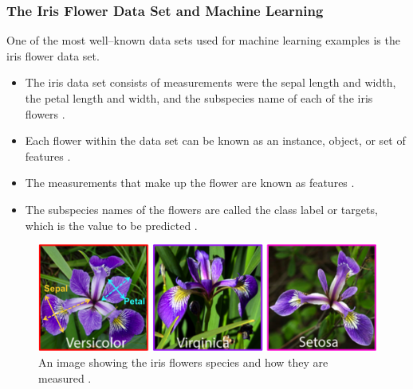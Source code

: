 \documentclass{beamer}
\begin{document}
\begin{frame}
\frametitle{The Iris Flower Data Set and Machine Learning}
\footnotesize
One of the most well--known data sets used for machine learning examples is the iris flower data set.
\newline
\begin{itemize}
    \item The iris data set consists of measurements were the sepal length and width, the petal length and width, and the subspecies name of each of the iris flowers \cite{pythonML}.
    \item Each flower within the data set can be known as an instance, object, or set of features \cite{pythonML}.
    \item The measurements that make up the flower are known as features \cite{pythonML}.
    \item The subspecies names of the flowers are called the class label or targets, which is the value to be predicted \cite{pythonML}. 
\end{itemize}

\begin{figure}[h]
\includegraphics[scale=0.3]{iris}
\caption{ \scriptsize An image showing the iris flowers species and how they are measured \cite{IrisPNG}.}
\end{figure}

\end{frame}
\end{document}
